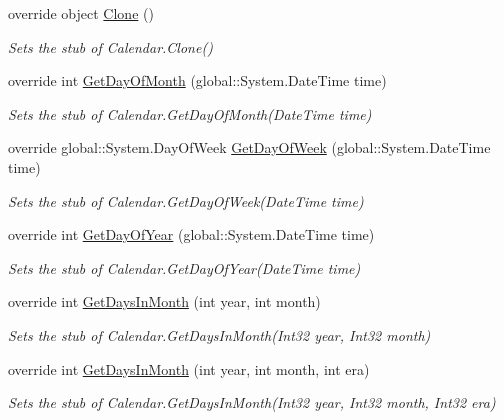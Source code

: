 \begin{DoxyCompactItemize}
override object \hyperlink{class_system_1_1_globalization_1_1_fakes_1_1_stub_calendar_ae099ea4f28f663fd578584c147b258bb}{Clone} ()
\begin{DoxyCompactList}\small\item\em Sets the stub of Calendar.\-Clone()\end{DoxyCompactList}\item 
override int \hyperlink{class_system_1_1_globalization_1_1_fakes_1_1_stub_calendar_ad837e0b995fa5788e81db16c6b8414a6}{Get\-Day\-Of\-Month} (global\-::\-System.\-Date\-Time time)
\begin{DoxyCompactList}\small\item\em Sets the stub of Calendar.\-Get\-Day\-Of\-Month(\-Date\-Time time)\end{DoxyCompactList}\item 
override global\-::\-System.\-Day\-Of\-Week \hyperlink{class_system_1_1_globalization_1_1_fakes_1_1_stub_calendar_a81e74939dd0e894255250c5701dc039c}{Get\-Day\-Of\-Week} (global\-::\-System.\-Date\-Time time)
\begin{DoxyCompactList}\small\item\em Sets the stub of Calendar.\-Get\-Day\-Of\-Week(\-Date\-Time time)\end{DoxyCompactList}\item 
override int \hyperlink{class_system_1_1_globalization_1_1_fakes_1_1_stub_calendar_af9207493a59b8a1b6632788f371bf4cd}{Get\-Day\-Of\-Year} (global\-::\-System.\-Date\-Time time)
\begin{DoxyCompactList}\small\item\em Sets the stub of Calendar.\-Get\-Day\-Of\-Year(\-Date\-Time time)\end{DoxyCompactList}\item 
override int \hyperlink{class_system_1_1_globalization_1_1_fakes_1_1_stub_calendar_af964c615b36d61622c38e788f4085809}{Get\-Days\-In\-Month} (int year, int month)
\begin{DoxyCompactList}\small\item\em Sets the stub of Calendar.\-Get\-Days\-In\-Month(\-Int32 year, Int32 month)\end{DoxyCompactList}\item 
override int \hyperlink{class_system_1_1_globalization_1_1_fakes_1_1_stub_calendar_ab5232a09c69fd3c5c71e46ebcc5a3953}{Get\-Days\-In\-Month} (int year, int month, int era)
\begin{DoxyCompactList}\small\item\em Sets the stub of Calendar.\-Get\-Days\-In\-Month(\-Int32 year, Int32 month, Int32 era)\end{DoxyCompactList}\item 

\end{DoxyCompactItemize}
